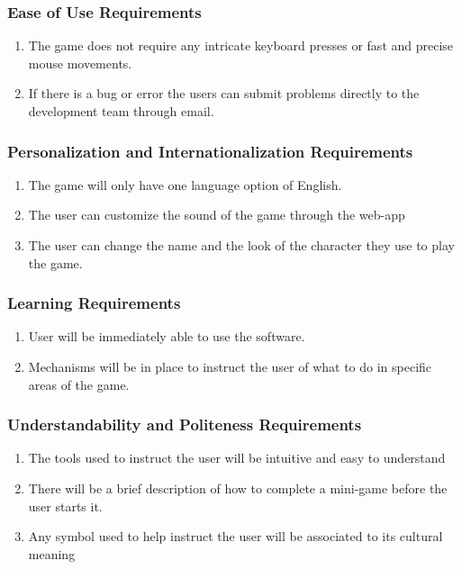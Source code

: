 \documentclass[]{article}
\begin{document}
\subsubsection{Ease of Use Requirements}
\label{ssub:ease_of_use_requirements}
\begin{enumerate}[{UH}1. ]
    \item The game does not require any intricate keyboard presses or fast and precise mouse movements. 
    \item If there is a bug or error the users can submit problems directly to the development team through email.
\end{enumerate}

\subsubsection{Personalization and Internationalization Requirements}
\label{ssub:personalization_and_internationalization_requirements}
\begin{enumerate}[{UH}1. ]
	\item The game will only have one language option of English. 
	\item The user can customize the sound of the game through the web-app 
	\item The user can change the name and the look of the character they use to play the game. 
\end{enumerate}

\subsubsection{Learning Requirements}
\label{ssub:learning_requirements}
\begin{enumerate}[{UH}1. ]
	\item User will be immediately able to use the software.
	\item Mechanisms will be in place to instruct the user of what to do in specific areas of the game.
\end{enumerate}

\subsubsection{Understandability and Politeness Requirements}
\label{ssub:understandability_and_politeness_requirements}
\begin{enumerate}[{UH}1. ]
	\item The tools used to instruct the user will be intuitive and easy to understand
	\item There will be a brief description of how to complete a mini-game before the user starts it.
	\item Any symbol used to help instruct the user will be associated to its cultural meaning
\end{enumerate}
\end{document}
